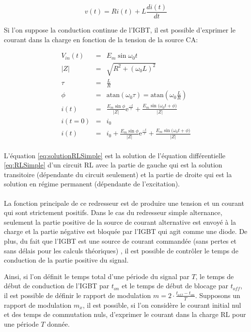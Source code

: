 \begin{equation}
\label{eq:RLSimple}
v(t) = R i(t) + L \frac{d i(t)}{dt}
\end{equation}

Si l'on suppose la conduction continue de l'IGBT, il est possible d'exprimer le courant dans la charge en fonction de la tension de la source CA:

\begin{eqnarray}
V_{in}(t) &=& E_m\sin{\omega_0 t} \\
|Z| &=& \sqrt{R^2 + (\omega_0 L)^2} \\
\tau &=& \frac{L}{R}\\
\phi &=& \mbox{atan}(\omega_0 \tau) = \mbox{atan}(\omega_0 \frac{L}{R}) \\
\label{eq:solutionRLSimple} i(t) &=& \frac{E_m\sin{\phi}}{|Z|}\mbox{e}^{\frac{-t}{\tau}} + \frac{E_m\sin{(\omega_0 t + \phi})}{|Z|}\\
i(t=0) &=& i_0\\
i(t) &=& i_0  + \frac{E_m\sin{\phi}}{|Z|}\mbox{e}^{\frac{-t}{\tau}} + \frac{E_m\sin{(\omega_0 t + \phi})}{|Z|} \\
\end{eqnarray}

L'équation \ref{eq:solutionRLSimple} est la solution de l'équation différentielle \ref{eq:RLSimple} d'un circuit RL avec la partie de gauche qui est la solution transitoire (dépendante du circuit seulement) et la partie de droite qui est la solution en régime permanent (dépendante de l'excitation). 

\paragraph{}
La fonction principale de ce redresseur est de produire une tension et un courant qui sont strictement positifs. Dans le cas du redresseur simple alternance, seulement la partie positive de la source de courant alternative est envoyé à la charge et la partie négative est bloquée par l'IGBT qui agit comme une diode. De plus, du fait que l'IGBT est une source de courant commandée (sans pertes et sans délais pour les calculs théoriques) , il est possible de contrôler le temps de conduction de la partie positive du signal.

Ainsi, si l'on définit le temps total d'une période du signal par $T$, le temps de début de conduction de l'IGBT par $t_{on}$ et le temps de début de blocage par $t_{off}$, il est possible de définir le rapport de modulation $m = 2\cdot \frac{t_{off}-t_{on}}{T}$. Supposons un rapport de modulation $m_x$, il est possible, si l'on considère le courant initial nul et des temps de commutation nuls, d'exprimer le courant dans la charge RL pour une période $T$ donnée.

